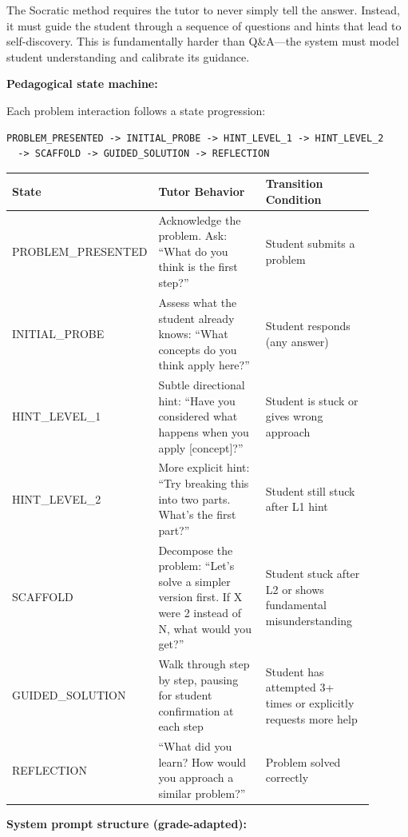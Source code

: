 The Socratic method requires the tutor to never simply tell the answer. Instead, it must guide the student through a sequence of questions and hints that lead to self-discovery. This is fundamentally harder than Q\&A---the system must model student understanding and calibrate its guidance.

\textbf{Pedagogical state machine:}

Each problem interaction follows a state progression:

\begin{verbatim}
PROBLEM_PRESENTED -> INITIAL_PROBE -> HINT_LEVEL_1 -> HINT_LEVEL_2
  -> SCAFFOLD -> GUIDED_SOLUTION -> REFLECTION
\end{verbatim}

\begin{tabular}{|p{0.14\linewidth}|p{0.42\linewidth}|p{0.34\linewidth}|}
\hline
\textbf{State} & \textbf{Tutor Behavior} & \textbf{Transition Condition} \\
\hline
PROBLEM\_PRESENTED & Acknowledge the problem. Ask: ``What do you think is the first step?'' & Student submits a problem \\
\hline
INITIAL\_PROBE & Assess what the student already knows: ``What concepts do you think apply here?'' & Student responds (any answer) \\
\hline
HINT\_LEVEL\_1 & Subtle directional hint: ``Have you considered what happens when you apply [concept]?'' & Student is stuck or gives wrong approach \\
\hline
HINT\_LEVEL\_2 & More explicit hint: ``Try breaking this into two parts. What's the first part?'' & Student still stuck after L1 hint \\
\hline
SCAFFOLD & Decompose the problem: ``Let's solve a simpler version first. If X were 2 instead of N, what would you get?'' & Student stuck after L2 or shows fundamental misunderstanding \\
\hline
GUIDED\_SOLUTION & Walk through step by step, pausing for student confirmation at each step & Student has attempted 3+ times or explicitly requests more help \\
\hline
REFLECTION & ``What did you learn? How would you approach a similar problem?'' & Problem solved correctly \\
\hline
\end{tabular}

\textbf{System prompt structure (grade-adapted):}

